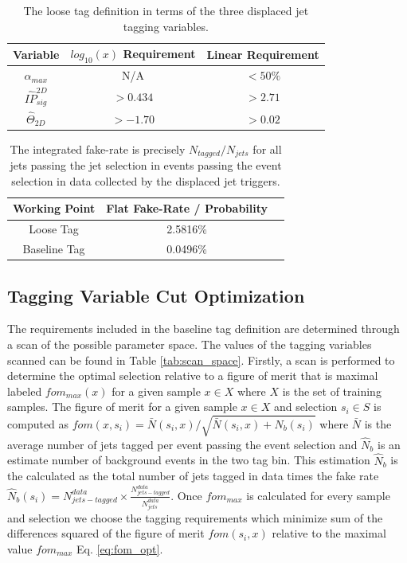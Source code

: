 \begin{table}
\caption{The loose tag definition in terms of the three displaced jet tagging variables. \label{tab:loose_tag_def}}
\begin{center}
\begin{tabular}{ccc}
\textbf{Variable} & \textbf{$log_{10}(x)$ Requirement} & \textbf{Linear Requirement}\\
\hline 
$\alpha_{max}$  &  N/A & $<50\%$\\
$\hat{IP}^{2D}_{sig}$  &  $>0.434$ &  $>2.71$\\
$\hat{\Theta}_{2D}$  &  $>-1.70$ & $>0.02$ 
\end{tabular}
\end{center}
\end{table}

\begin{table}
\caption{The integrated fake-rate is precisely $N_{tagged}/N_{jets}$ for all jets passing the jet selection in events
passing the event selection in data collected by the displaced jet triggers. \label{tab:fake_rate_wp}}
\begin{center}
\begin{tabular}{ccc}
\textbf{Working Point} & Flat Fake-Rate / Probability \\
\hline 
Loose Tag & 2.5816\%\\
Baseline Tag & 0.0496\%\\
\end{tabular}

\end{center}
\end{table}


\subsection{Tagging Variable Cut Optimization}

The requirements included in the baseline tag definition are determined through a scan of the possible parameter space. The values
of the tagging variables scanned can be found in Table \ref{tab:scan_space}. Firstly, a scan is performed to determine the optimal 
selection relative to a figure of merit that is maximal labeled $fom_{max}(x)$ for a given sample $x\in X$ where $X$ is the set of training samples.
The figure of merit for a given sample $x\in X$ and selection $s_{i} \in S$ is computed as $fom(x,s_i) = \bar{N}(s_i,x)/ \sqrt{\bar{N}(s_i,x) + \hat{N}_b(s_i)}$ where 
$\bar{N}$ is the average number of jets tagged per event passing the event selection and $\hat{N}_{b}$ is an estimate number of background events
 in the two tag bin. This estimation $\hat{N}_b$ is the  calculated as the total number of jets tagged in data times the fake rate $\hat{N}_{b}(s_i) = N^{data}_{jets-tagged} \times \frac{N_{jets-tagged}^{data}}{N_{jets}^{data}}$.  
Once $fom_{max}$ is calculated for every sample and selection we choose the tagging requirements which minimize sum of the differences squared of the figure of merit
$fom(s_i,x)$ relative to the maximal value $fom_{max}$  Eq. \ref{eq:fom_opt}.

